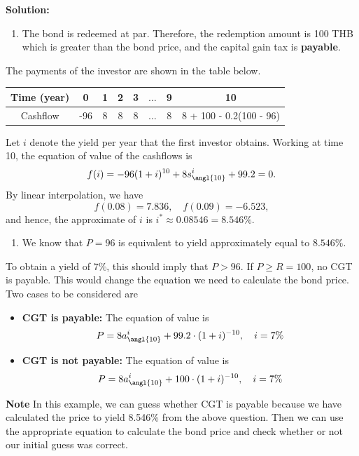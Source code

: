\documentclass[
]{book}
\providecommand{\tightlist}{%
  \setlength{\itemsep}{0pt}\setlength{\parskip}{0pt}}
\theoremstyle{definition}
\theoremstyle{definition}
\theoremstyle{definition}
\theoremstyle{definition}
\theoremstyle{remark}
\begin{document}
\textbf{Solution:}

\begin{enumerate}
\def\labelenumi{\arabic{enumi}.}
\tightlist
\item
  The bond is redeemed at par. Therefore, the redemption amount is 100
  THB which is greater than the bond price, and the capital gain tax
  is \textbf{payable}.
\end{enumerate}

The payments of the investor are shown in the table below.

\begin{longtable}[]{@{}cccccccc@{}}
\toprule
Time (year) & 0 & 1 & 2 & 3 & \(\ldots\) & 9 & 10 \\
\midrule
\endhead
Cashflow & -96 & 8 & 8 & 8 & \(\ldots\) & 8 & 8 + 100 - 0.2(100 - 96) \\
\bottomrule
\end{longtable}

Let \(i\) denote the yield per year that the first investor obtains.
Working at time 10, the equation of value of the cashflows is
\[ f(i) =  -96 (1+i)^{10} + 8 s^i_{\angl{10}} +  99.2 = 0.\] By linear
interpolation, we have \[ f(0.08) = 7.836, \quad f(0.09) = -6.523, \]
and hence, the approximate of \(i\) is \(i^* \approx 0.08546 = 8.546\%\).

\begin{enumerate}
\def\labelenumi{\arabic{enumi}.}
\setcounter{enumi}{1}
\tightlist
\item
  We know that \(P = 96\) is equivalent to yield approximately equal to
  \(8.546\%\).
\end{enumerate}

To obtain a yield of \(7\%\), this should imply that \(P > 96\). If
\(P \ge R = 100\), no CGT is payable. This would change the equation we
need to calculate the bond price. Two cases to be considered are

\begin{itemize}
\item
  \textbf{CGT is payable:} The equation of value is
  \[ P = 8 a^i_{\angl{10}} +  99.2\cdot (1+i)^{-10}, \quad i = 7\%\]
\item
  \textbf{CGT is not payable:} The equation of value is
  \[ P = 8 a^i_{\angl{10}} +  100\cdot (1+i)^{-10}, \quad i = 7\%\]
\end{itemize}

\textbf{Note} In this example, we can guess whether CGT is payable because we
have calculated the price to yield 8.546\% from the above question. Then
we can use the appropriate equation to calculate the bond price and
check whether or not our initial guess was correct.
\end{document}
